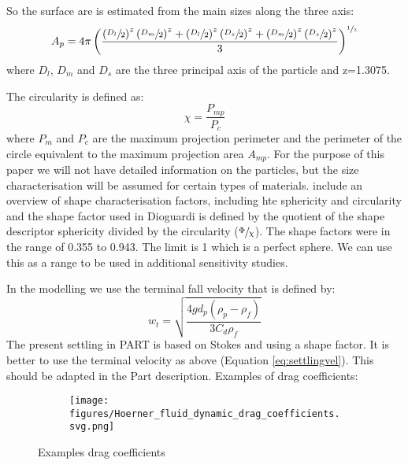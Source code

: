 \documentclass[english]{deltares_manual}
\begin{document}
So the surface are is estimated from the main sizes along the three axis:
\begin{equation}
	A_{p}=4\pi \left(  \frac{\left( \sfrac{D_{l}}{2}\right)^{z}\left( \sfrac{D_{m}}{2}\right)^{z} + \left( \sfrac{D_{l}}{2}\right)^{z}\left( \sfrac{D_{s}}{2}\right)^{z} + \left( \sfrac{D_{m}}{2}\right)^{z}\left( \sfrac{D_{s}}{2}\right)^{z}}{3} \right)^{\sfrac{1}{z}}
	\label{eq:sphersurf}
\end{equation}
where $D_{l}$, $D_{m}$ and $D_{s}$ are the three principal axis of the particle and z=1.3075.

The circularity is defined as:
\begin{equation}
	\chi = \frac{P_{mp}}{P_{c}}
\end{equation}
where $P_{m}$ and $P_{c}$ are the maximum projection perimeter and the perimeter of the circle equivalent to the maximum projection area $A_{mp}$.
For the purpose of this paper we will not have detailed information on the particles, but the size characterisation will be assumed for certain types of materials. 
\cite{VanMelkebeke2020} include an overview of shape characterisation factors, including hte sphericity and circularity and the shape factor used in Dioguardi is defined by the quotient of the shape descriptor sphericity divided by the circularity ($\sfrac{\Phi}{\chi}$). The shape factors were in the range of 0.355 to 0.943. The limit is 1 which is a perfect sphere. We can use this as a range to be used in additional sensitivity studies. 

In the modelling we use the terminal fall velocity that is defined by:
\begin{equation}
	w_{t}=\sqrt{\frac{4gd_{p}\left( \rho_{p}-\rho_{f}\right)}{3C_{d}\rho_{f}}}
	\label{eq:settlingvel}
\end{equation}
The present settling in PART is based on Stokes and using a shape factor. It is better to use the terminal velocity as above (Equation \ref{eq:settlingvel}). This should be adapted in the Part description.
Examples of drag coefficients:
\begin{figure}[H]%
	\centering
	\begin{subfigure}{0.25\textwidth}
		\begin{tcolorbox}[interior hidden, 
		boxsep=2pt,
		left=2pt,
		right=2pt,
		top=2pt,]
			\texttt{[image: figures/Hoerner\_fluid\_dynamic\_drag\_coefficients.svg.png]}%
		\end{tcolorbox}
	\end{subfigure}
	\caption{Examples drag coefficients}
	\label{fig:dragcoeff}
\end{figure}
\end{document}
